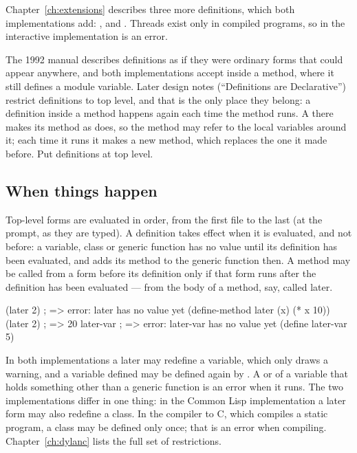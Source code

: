 \noindent Chapter~\ref{ch:extensions} describes three more definitions,
which both implementations add: ,
 and . Threads
exist only in compiled programs, so in the interactive implementation
 is an error.

The 1992 manual describes definitions as if they were ordinary forms that
could appear anywhere, and both implementations accept  inside
a method, where it still defines a module variable. Later design notes
(``Definitions are Declarative'') restrict definitions to top level, and
that is the only place they belong: a definition inside a method happens
again each time the method runs. A  there makes its
method as  does, so the method may refer to the local
variables around it; each time it runs it makes a new method, which
replaces the one it made before. Put definitions at top level.

\subsection{When things happen}\label{sec:syntax-when}

Top-level forms are evaluated in order, from the first file to the last
(at the prompt, as they are typed). A definition takes effect when it is
evaluated, and not before: a variable, class or generic function has no
value until its definition has been evaluated, and 
adds its method to the generic function then. A method may be called
from a form before its definition only if that form runs after the
definition has been evaluated --- from the body of a method, say, called
later.

\begin{dylan}
(later 2)                   ; => error: later has no value yet
(define-method later (x) (* x 10))
(later 2)                   ; => 20
later-var                   ; => error: later-var has no value yet
(define later-var 5)
\end{dylan}

\noindent In both implementations a later  may redefine a
variable, which only draws a warning, and a variable 
defined may be defined again by . A  or
 of a variable that holds something other
than a generic function is an error when it runs. The two implementations
differ in one thing: in the Common Lisp implementation a later form may
also redefine a class. In the compiler to C, which compiles a static
program, a class may be defined only once; that is an error when
compiling. Chapter~\ref{ch:dylanc} lists the full set of restrictions.

